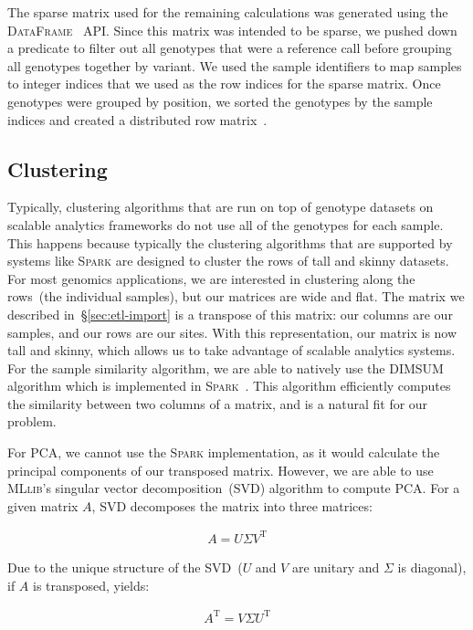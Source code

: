 \documentclass[11pt]{article} %
\begin{document}
The sparse matrix used for the remaining calculations was generated using the
\textsc{DataFrame}~\cite{armbrust15} API. Since this matrix was intended to
be sparse, we pushed down a predicate to filter out all genotypes that were a
reference call before grouping all genotypes together by variant. We used
the sample identifiers to map samples to integer indices that we used as the
row indices for the sparse matrix. Once genotypes were grouped by position,
we sorted the genotypes by the sample indices and created a distributed
row matrix~\cite{zadeh15}.

\subsection{Clustering}
\label{sec:clustering}

Typically, clustering algorithms that are run on top of genotype datasets on
scalable analytics frameworks do not use all of the genotypes for each sample.
This happens because typically the clustering algorithms that are supported
by systems like \textsc{Spark} are designed to cluster the rows of tall and
skinny datasets. For most genomics applications, we are interested in clustering
along the rows~(the individual samples), but our matrices are wide and flat.
The matrix we described in~\S\ref{sec:etl-import} is a transpose of this
matrix: our columns are our samples, and our rows are our sites. With this
representation, our matrix is now tall and skinny, which allows us to take
advantage of scalable analytics systems. For the sample similarity algorithm,
we are able to natively use the \textsc{DIMSUM} algorithm which is implemented
in \textsc{Spark}~\cite{meng15, zadeh13}. This algorithm efficiently computes
the similarity between two columns of a matrix, and is a natural fit for our
problem.

For PCA, we cannot use the \textsc{Spark} implementation, as it would calculate
the principal components of our transposed matrix. However, we are able to use
\textsc{MLlib}'s singular vector decomposition~(SVD) algorithm to compute PCA.
For a given matrix $A$, SVD decomposes the matrix into three matrices:

\begin{align}
A = U \Sigma V^\text{T}
\end{align}

Due to the unique structure of the SVD~($U$ and $V$ are unitary and $\Sigma$
is diagonal), if $A$ is transposed, yields:

\begin{align}
A^\text{T} = V \Sigma U^\text{T}
\end{align}
\end{document}
